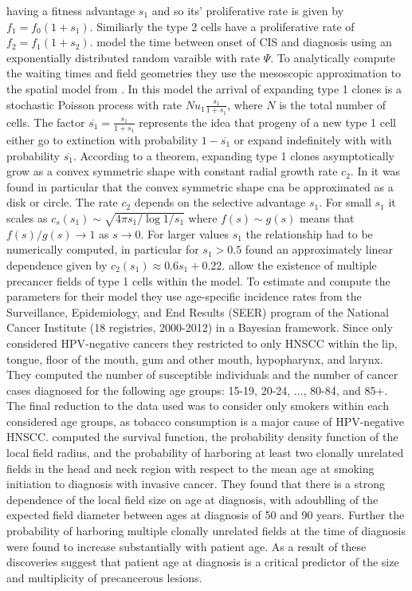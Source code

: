 \documentclass[\main/thesis.tex]{subfiles}
\begin{document}
having a fitness advantage $s_1$ and so its' proliferative rate is given by $f_1 
= f_0(1 + s_1)$. Similiarly the type 2 cells have a proliferative rate of $f_2 = 
f_1(1 + s_2)$. \textcite{Ryser} model the time between onset of CIS and 
diagnosis using an exponentially distributed random varaible with rate $\Psi$. 
To analytically compute the waiting times and field geometries they use the 
mesoscopic approximation to the spatial model from \textcite{Foo}. In this model 
the arrival of expanding type 1 clones is a stochastic Poisson process with rate 
$Nu_1\frac{s_1}{1+s_1}$, where $N$ is the total number of cells. The factor 
$\overline{s_1}=\frac{s_1}{1+s_1}$ represents the idea that progeny of a new 
type 1 cell either go to extinction with probability $1-\overline{s_1}$ or 
expand indefinitely with with probability $\overline{s_1}$. According to a 
theorem, expanding type 1 clones asymptotically grow as a convex symmetric shape 
with constant radial growth rate $c_2$. In \textcite{Foo} it was found in 
particular that the convex symmetric shape cna be approximated as a disk or 
circle. The rate $c_2$ depends on the selective advantage $s_1$. For small $s_1$ 
it scales as $c_s(s_1) \sim \sqrt{4\pi s_1 / \log{1/s_1}}$ where $f(s) \sim 
g(s)$ means that $f(s)/g(s) \rightarrow 1$ as $s \rightarrow 0$. For larger 
values $s_1$ the relationship had to be numerically computed, in particular for 
$s_1 > 0.5$ \textcite{Ryser} found an approximately linear dependence given by 
$c_2(s_1) \approx 0.6s_1 + 0.22$. \textcite{Ryser} allow the existence of 
multiple precancer fields of type 1 cells within the model. To estimate and 
compute the parameters for their model they use age-specific incidence rates 
from the Surveillance, Epidemiology, and End Results (SEER) program of the 
National Cancer Institute (18 registries, 2000-2012) in a Bayesian framework. 
Since \textcite{Ryser} only considered HPV-negative cancers they restricted to 
only HNSCC within the lip, tongue, floor of the mouth, gum and other mouth, 
hypopharynx, and larynx. They computed the number of susceptible individuals and 
the number of cancer cases diagnosed for the following age groups: 15-19, 20-24, 
..., 80-84, and 85+. The final reduction to the data used was to consider only 
smokers within each considered age groups, as tobacco consumption is a major 
cause of HPV-negative HNSCC. \textcite{Ryser} computed the survival function, 
the probability density function of the local field radius, and the probability 
of harboring at least two clonally unrelated fields in the head and neck region 
with respect to the mean age at smoking initiation to diagnosis with invasive 
cancer. They found that there is a strong dependence of the local field size on 
age at diagnosis, with adoublling of the expected field diameter between ages at 
diagnosis of 50 and 90 years. Further the probability of harboring multiple 
clonally unrelated fields at the time of diagnosis were found to increase 
substantially with patient age. As a result of these discoveries 
\textcite{Ryser} suggest that patient age at diagnosis is a critical predictor 
of the size and multiplicity of precancerous lesions. 
\end{document}
